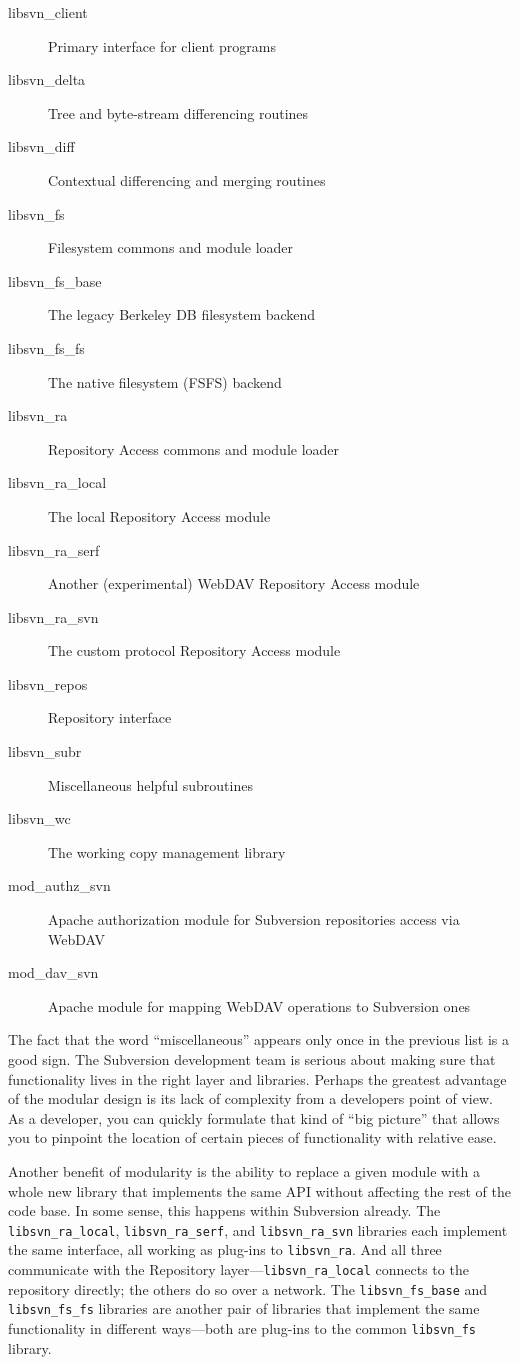 \begin{description}
\item[libsvn\_client]
Primary interface for client programs
\item[libsvn\_delta]
Tree and byte-stream differencing routines
\item[libsvn\_diff]
Contextual differencing and merging routines
\item[libsvn\_fs]
Filesystem commons and module loader
\item[libsvn\_fs\_base]
The legacy Berkeley DB filesystem backend
\item[libsvn\_fs\_fs]
The native filesystem (FSFS) backend
\item[libsvn\_ra]
Repository Access commons and module loader
\item[libsvn\_ra\_local]
The local Repository Access module
\item[libsvn\_ra\_serf]
Another (experimental) WebDAV Repository Access module
\item[libsvn\_ra\_svn]
The custom protocol Repository Access module
\item[libsvn\_repos]
Repository interface
\item[libsvn\_subr]
Miscellaneous helpful subroutines
\item[libsvn\_wc]
The working copy management library
\item[mod\_authz\_svn]
Apache authorization module for Subversion repositories access via
WebDAV
\item[mod\_dav\_svn]
Apache module for mapping WebDAV operations to Subversion ones
\end{description}

The fact that the word ``miscellaneous'' appears only once in the
previous list is a good sign. The Subversion development team is serious
about making sure that functionality lives in the right layer and
libraries. Perhaps the greatest advantage of the modular design is its
lack of complexity from a developer\textquotesingle s point of view. As
a developer, you can quickly formulate that kind of ``big picture'' that
allows you to pinpoint the location of certain pieces of functionality
with relative ease.

Another benefit of modularity is the ability to replace a given module
with a whole new library that implements the same API without affecting
the rest of the code base. In some sense, this happens within Subversion
already. The \texttt{libsvn\_ra\_local}, \texttt{libsvn\_ra\_serf}, and
\texttt{libsvn\_ra\_svn} libraries each implement the same interface,
all working as plug-ins to \texttt{libsvn\_ra}. And all three
communicate with the Repository layer---\texttt{libsvn\_ra\_local}
connects to the repository directly; the others do so over a network.
The \texttt{libsvn\_fs\_base} and \texttt{libsvn\_fs\_fs} libraries are
another pair of libraries that implement the same functionality in
different ways---both are plug-ins to the common \texttt{libsvn\_fs}
library.

